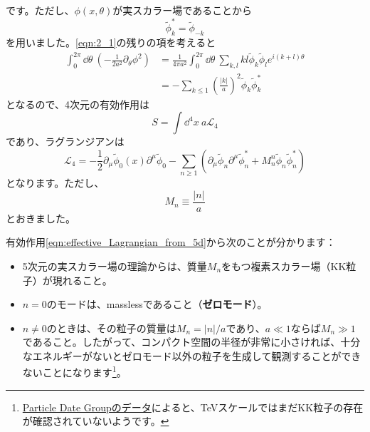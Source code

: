 \documentclass[unicode,a4paper,10pt]{ltjsarticle}
\begin{document}
です。ただし、$\phi(x,\theta)$が実スカラー場であることから
\begin{equation}
   \tilde{\phi}_{k}^{\ast}=\tilde{\phi}_{-k}
\end{equation}
を用いました。\eqref{eqn:2_1}の残りの項を考えると
\begin{align}
   \int_{0}^{2\pi}\dd \theta\ 
   \left(  
      -
      \frac{1}{2a^2}\partial_{\theta}\phi^2
   \right)   
   &=   
   \frac{1}{4\pi a^2}
   \int_{0}^{2\pi}\dd \theta\ 
   \sum_{k,l}kl\tilde{\phi}_{k}\tilde{\phi}_{l}e^{i(k+l)\theta}
   \nonumber
   \\
   &=
   -\sum_{k\leq 1}\left( \frac{|k|}{a} \right)^2 \tilde{\phi}_{k}\tilde{\phi}_{k}^{\ast}
\end{align}
となるので、4次元の有効作用は
\begin{equation}
   S
   =
   \int\dd^4 x\ a\mathcal{L}_{4}
\end{equation}
であり、ラグランジアンは
\begin{equation}
   \mathcal{L}_{4}
   =
   -\frac{1}{2}\partial_{\mu}\tilde{\phi}_{0}(x)\partial^{\mu}\tilde{\phi}_{0}
   -\sum_{n\geq 1}
   \left(  
      \partial_{\mu}\tilde{\phi}_{n}\partial^{\mu}\tilde{\phi}_{n}^{\ast}
      +
      M_{n}^{n}\tilde{\phi}_{n}\tilde{\phi}_{n}^{\ast}
   \right)
   \label{eqn:effective_Lagrangian_from_5d}
\end{equation}
となります。ただし、
\begin{equation}
   M_{n}
   \equiv
   \frac{|n|}{a}
\end{equation}
とおきました。

有効作用\eqref{eqn:effective_Lagrangian_from_5d}から次のことが分かります：
\begin{itemize}
   \item 
   5次元の実スカラー場の理論からは、質量$M_{n}$をもつ複素スカラー場（KK粒子）が現れること。
   \item 
   $n=0$のモードは、masslessであること（\textbf{ゼロモード}）。
   \item 
   $n\neq 0$のときは、その粒子の質量は$M_{n}=|n|/a$であり、$a\ll 1$ならば$M_{n}\gg 1$であること。したがって、コンパクト空間の半径が非常に小さければ、十分なエネルギーがないとゼロモード以外の粒子を生成して観測することができないことになります\footnote{
      \href{https://pdg.lbl.gov/2023/tables/rpp2023-sum-searches.pdf}{Particle Date Groupのデータ}によると、TeVスケールではまだKK粒子の存在が確認されていないようです。
   }。
\end{itemize}
\end{document}
